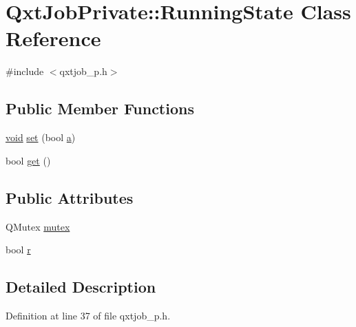 \hypertarget{class_qxt_job_private_1_1_running_state}{\section{Qxt\-Job\-Private\-:\-:Running\-State Class Reference}
\label{class_qxt_job_private_1_1_running_state}
}


{\ttfamily \#include $<$qxtjob\-\_\-p.\-h$>$}

\subsection*{Public Member Functions}
\begin{DoxyCompactItemize}
\item 
\hyperlink{group___u_a_v_objects_plugin_ga444cf2ff3f0ecbe028adce838d373f5c}{void} \hyperlink{class_qxt_job_private_1_1_running_state_a1571ef7ba5fa948830f460de31fa0e10}{set} (bool \hyperlink{glext_8h_ac8729153468b5dcf13f971b21d84d4e5}{a})
\item 
bool \hyperlink{class_qxt_job_private_1_1_running_state_a14db931c5556bcd10bac51a4cb887131}{get} ()
\end{DoxyCompactItemize}
\subsection*{Public Attributes}
\begin{DoxyCompactItemize}
\item 
Q\-Mutex \hyperlink{class_qxt_job_private_1_1_running_state_ac22db23c290e8b30a0cb43d8838afc36}{mutex}
\item 
bool \hyperlink{class_qxt_job_private_1_1_running_state_a57199a26b30bc87fd316b94a1e5de235}{r}
\end{DoxyCompactItemize}


\subsection{Detailed Description}


Definition at line 37 of file qxtjob\-\_\-p.\-h.



